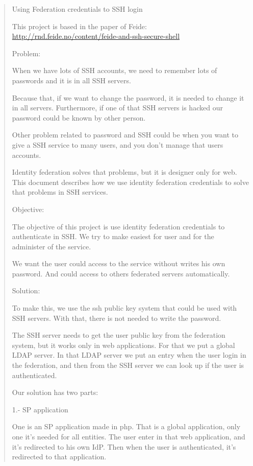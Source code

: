 \begin{quote}

Using Federation credentials to SSH login

This project is based in the paper of Feide:
\url{http://rnd.feide.no/content/feide-and-ssh-secure-shell}

Problem:

    When we have lots of SSH accounts, we need to remember lots of
    passwords and it is in all SSH servers.

    Because that, if we want to change the password, it is needed to
    change it in all servers.  Furthermore, if one of that SSH servers
    is hacked our password could be known by other person.

    Other problem related to password and SSH could be when you want
    to give a SSH service to many users, and you don't manage that
    users accounts. 

    Identity federation solves that problems, but it is designer only
    for web. This document describes how we use identity federation
    credentials to solve that problems in SSH services.

Objective:

    The objective of this project is use identity federation
    credentials to authenticate in SSH. We try to make easiest for
    user and for the administer of the service.

    We want the user could access to the service without writes his own
    password. And could access to others federated servers
    automatically.

Solution:

    To make this, we use the ssh public key system that could be used
    with SSH servers. With that, there is not needed to write the
    password.

    The SSH server needs to get the user public key from the federation
    system, but it works only in web applications. For that we put a
    global LDAP server. In that LDAP server we put an entry when the
    user login in the federation, and then from the SSH server we can
    look up if the user is authenticated.

    Our solution has two parts:
    
    1.- SP application

    One is an SP application made in php.  That is a global
    application, only one it's needed for all entities. The user enter
    in that web application, and it's redirected to his own IdP. Then
    when the user is authenticated, it's redirected to that
    application.


\end{quote}
